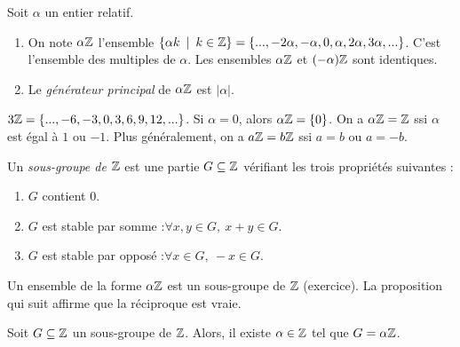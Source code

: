 \begin{definition}\index{$\alpha\Z$}

Soit $\alpha$ un entier relatif.
\begin{enumerate}
\item On note $\alpha\Z$ l'ensemble $\{ \alpha k\:\mid\: k\in \Z\} = \{..., -2\alpha, -\alpha, 0, \alpha, 2\alpha, 3\alpha, ...\}$. C'est l'ensemble des multiples de $\alpha$. Les ensembles $\alpha\Z$ et $(-\alpha)\mathbb{Z}$ sont identiques.
\item Le \emph{générateur principal} de $\alpha\Z$ est $|\alpha|$.
\end{enumerate}
\end{definition}

\begin{exemple}
$3\mathbb{Z} = \{...,-6,-3,0,3,6,9,12,...\}$. Si $\alpha=0$, alors $\alpha\mathbb{Z} = \{0\}$. On a $\alpha\mathbb{Z} = \mathbb{Z}$ ssi $\alpha$ est égal à $1$ ou $-1$. Plus généralement, on a $a\mathbb{Z}=b\mathbb{Z}$ ssi $a=b$ ou $a=-b$.
\end{exemple}


\begin{definition}
Un \emph{sous-groupe de $\mathbb{Z}$} est une partie $G \subseteq \mathbb{Z}$ vérifiant les trois propriétés suivantes : 
\begin{enumerate}
\item $G$ contient $0$.
\item $G$ est stable par somme :$\forall x, y\in G, \: x+y \in G$.
\item $G$ est stable par opposé :$\forall x\in G, \: -x \in G$.
\end{enumerate}
\end{definition}

Un ensemble de la forme $\alpha\Z$ est un sous-groupe de $\mathbb{Z}$ (exercice). La proposition qui suit affirme que la réciproque est vraie.

\begin{proposition}
Soit $G\subseteq \mathbb{Z}$ un sous-groupe de $\mathbb{Z}$. Alors, il existe $\alpha \in \mathbb{Z}$ tel que $G = \alpha\mathbb{Z}$. 
\end{proposition}


